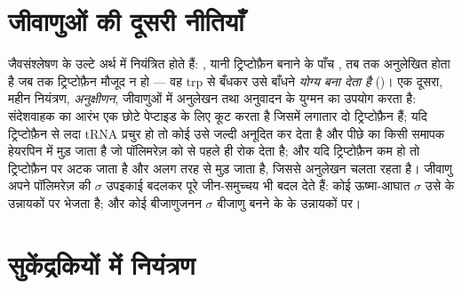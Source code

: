 \section{जीवाणुओं की दूसरी नीतियाँ}

\begin{proposition}[दमन, अनुक्षीणन और सिग्मा कारक]\label{prop:b1:expression-control:trp}
जैवसंश्लेषण के  उल्टे अर्थ में नियंत्रित होते हैं:
\emph{}, यानी ट्रिप्टोफ़ैन बनाने के पाँच , तब तक अनुलेखित
होता है जब तक ट्रिप्टोफ़ैन मौजूद न हो --- वह  trp
 से बँधकर उसे  बाँधने \emph{योग्य बना देता है} ()।
एक दूसरा, महीन नियंत्रण, \emph{अनुक्षीणन}, जीवाणुओं में अनुलेखन तथा
अनुवादन के युग्मन का उपयोग करता है: संदेशवाहक का आरंभ एक छोटे पेप्टाइड
के लिए कूट करता है जिसमें लगातार दो ट्रिप्टोफ़ैन हैं; यदि
ट्रिप्टोफ़ैन से लदा tRNA प्रचुर हो तो कोई  उसे जल्दी अनूदित कर
देता है और पीछे का  किसी समापक हेयरपिन में मुड़ जाता है जो पॉलिमरेज़ को
 से पहले ही रोक देता है; और यदि ट्रिप्टोफ़ैन कम हो तो 
ट्रिप्टोफ़ैन  पर अटक जाता है और  अलग तरह से मुड़ जाता है, जिससे
अनुलेखन चलता रहता है। जीवाणु अपने पॉलिमरेज़ की $\sigma$ उपइकाई बदलकर पूरे
जीन-समुच्चय भी बदल देते हैं: कोई ऊष्मा-आघात $\sigma$ उसे   के
उन्नायकों पर भेजता है; और कोई बीजाणुजनन $\sigma$ बीजाणु बनने के  के
उन्नायकों पर।
\end{proposition}

\section{सुकेंद्रकियों में नियंत्रण}

